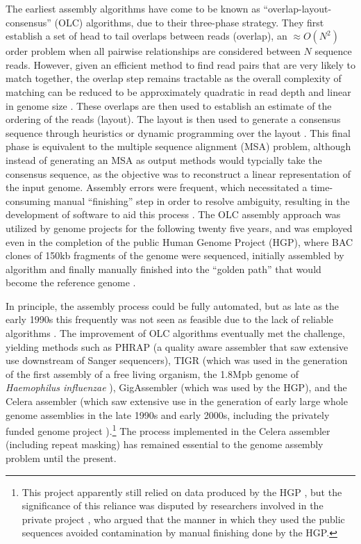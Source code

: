 The earliest assembly algorithms have come to be known as ``overlap-layout-consensus'' (OLC) algorithms, due to their three-phase strategy.
They first establish a set of head to tail overlaps between reads (overlap), an $\approx O(N^{2})$ order problem when all pairwise relationships are considered between $N$ sequence reads.
However, given an efficient method to find read pairs that are very likely to match together, the overlap step remains tractable as the overall complexity of matching can be reduced to be approximately quadratic in read depth and linear in genome size \cite{huang1992contig}.
These overlaps are then used to establish an estimate of the ordering of the reads (layout).
The layout is then used to generate a consensus sequence through heuristics or dynamic programming over the layout \cite{kececioglu1995combinatorial}.
This final phase is equivalent to the multiple sequence alignment (MSA) problem, although instead of generating an MSA as output methods would typcially take the consensus sequence, as the objective was to reconstruct a linear representation of the input genome.
Assembly errors were frequent, which necessitated a time-consuming manual ``finishing'' step in order to resolve ambiguity, resulting in the development of software to aid this process \cite{gordon1998consed}.
The OLC assembly approach was utilized by genome projects for the following twenty five years, and was employed even in the completion of the public Human Genome Project (HGP), where BAC clones of 150kb fragments of the genome were sequenced, initially assembled by algorithm and finally manually finished into the ``golden path'' that would become the reference genome \cite{international2001initial}.

In principle, the assembly process could be fully automated, but as late as the early 1990s this frequently was not seen as feasible due to the lack of reliable algorithms \cite{mahy1991sequencing}.
The improvement of OLC algorithms eventually met the challenge, yielding methods such as PHRAP \cite{green1999phrap} (a quality aware assembler that saw extensive use downstream of Sanger sequencers), TIGR \cite{sutton1995tigr} (which was used in the generation of the first assembly of a free living organism, the 1.8Mpb genome of \emph{Haemophilus influenzae} \cite{fleischmann1995whole}), GigAssembler \cite{kent2001assembly} (which was used by the HGP), and the Celera assembler \cite{myers2000whole,miller2008aggressive} (which saw extensive use in the generation of early large whole genome assemblies in the late 1990s and early 2000s, including the privately funded genome project \cite{venter2001sequence}).\footnote{This project apparently still relied on data produced by the HGP \cite{waterston2002sequencing}, but the significance of this reliance was disputed by researchers involved in the private project \cite{myers2002sequencing}, who argued that the manner in which they used the public sequences avoided contamination by manual finishing done by the HGP.}
The process implemented in the Celera assembler (including repeat masking) has remained essential to the genome assembly problem until the present.

